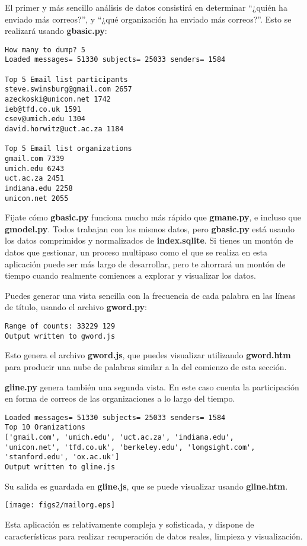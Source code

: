 El primer y más sencillo análisis de datos consistirá en determinar ``¿quién ha enviado más correos?'',
y ``¿qué organización ha enviado más correos?''. Esto se realizará usando {\bf gbasic.py}:

\beforeverb
\begin{verbatim}
How many to dump? 5
Loaded messages= 51330 subjects= 25033 senders= 1584

Top 5 Email list participants
steve.swinsburg@gmail.com 2657
azeckoski@unicon.net 1742
ieb@tfd.co.uk 1591
csev@umich.edu 1304
david.horwitz@uct.ac.za 1184

Top 5 Email list organizations
gmail.com 7339
umich.edu 6243
uct.ac.za 2451
indiana.edu 2258
unicon.net 2055
\end{verbatim}
\afterverb
%
Fijate cómo {\bf gbasic.py} funciona mucho más rápido que {\bf gmane.py},
e incluso que {\bf gmodel.py}. Todos trabajan con los mismos datos, pero
{\bf gbasic.py} está usando los datos comprimidos y normalizados de
{\bf index.sqlite}. Si tienes un montón de datos que gestionar, un proceso
multipaso como el que se realiza en esta aplicación puede ser más largo de desarrollar,
pero te ahorrará un montón de tiempo cuando realmente comiences a explorar
y visualizar los datos.

Puedes generar una vista sencilla con la frecuencia de cada palabra en las
líneas de título, usando el archivo {\bf gword.py}:

\beforeverb
\begin{verbatim}
Range of counts: 33229 129
Output written to gword.js
\end{verbatim}
\afterverb
%
Esto genera el archivo {\bf gword.js}, que puedes visualizar utilizando
{\bf gword.htm} para producir una nube de palabras similar a la del comienzo
de esta sección. 

{\bf gline.py} genera también una segunda vista. En este caso cuenta la participación
en forma de correos de las organizaciones a lo largo del tiempo.

\beforeverb
\begin{verbatim}
Loaded messages= 51330 subjects= 25033 senders= 1584
Top 10 Oranizations
['gmail.com', 'umich.edu', 'uct.ac.za', 'indiana.edu', 
'unicon.net', 'tfd.co.uk', 'berkeley.edu', 'longsight.com', 
'stanford.edu', 'ox.ac.uk']
Output written to gline.js
\end{verbatim}
\afterverb
%
Su salida es guardada en {\bf gline.js}, que se puede visualizar usando {\bf gline.htm}.

\beforefig
\centerline{\texttt{[image: figs2/mailorg.eps]}}
\afterfig

Esta aplicación es relativamente compleja y sofisticada, y
dispone de características para realizar recuperación de datos reales, limpieza y visualización.
